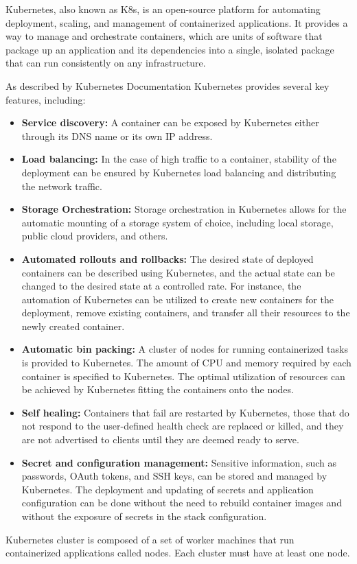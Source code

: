 Kubernetes, also known as K8s, is an open-source platform for automating deployment, scaling, and management of containerized applications. It provides a way to manage and orchestrate containers, which are units of software that package up an application and its dependencies into a single, isolated package that can run consistently on any infrastructure. \cite{vayghan2019Kubernetes}

As described by Kubernetes Documentation \cite{docuKubeComponents} Kubernetes provides several key features, including:
\begin{itemize}
    \item \textbf{Service discovery:} A container can be exposed by Kubernetes either through its DNS name or its own IP address.
    \item \textbf{Load balancing:} In the case of high traffic to a container, stability of the deployment can be ensured by Kubernetes load balancing and distributing the network traffic.
    \item \textbf{Storage Orchestration:} Storage orchestration in Kubernetes allows for the automatic mounting of a storage system of choice, including local storage, public cloud providers, and others.
    \item \textbf{Automated rollouts and rollbacks:} The desired state of deployed containers can be described using Kubernetes, and the actual state can be changed to the desired state at a controlled rate. For instance, the automation of Kubernetes can be utilized to create new containers for the deployment, remove existing containers, and transfer all their resources to the newly created container.
    \item \textbf{Automatic bin packing:} A cluster of nodes for running containerized tasks is provided to Kubernetes. The amount of CPU and memory required by each container is specified to Kubernetes. The optimal utilization of resources can be achieved by Kubernetes fitting the containers onto the nodes.
    \item \textbf{Self healing:} Containers that fail are restarted by Kubernetes, those that do not respond to the user-defined health check are replaced or killed, and they are not advertised to clients until they are deemed ready to serve.
    \item \textbf{Secret and configuration management:} Sensitive information, such as passwords, OAuth tokens, and SSH keys, can be stored and managed by Kubernetes. The deployment and updating of secrets and application configuration can be done without the need to rebuild container images and without the exposure of secrets in the stack configuration.
\end{itemize}
\label{chap:kubeComponents}
Kubernetes cluster is composed of a set of worker machines that run containerized applications called nodes. Each cluster must have at least one node. \cite{docuKubeComponents}

